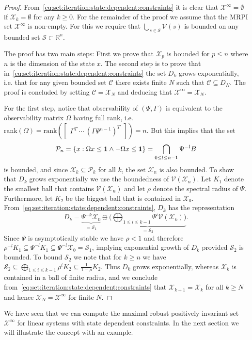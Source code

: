\documentclass[letterpaper, 10pt, conference]{ieeeconf} %
\begin{document}
\begin{proof}
From~\eqref{eq:set:iteration:state:dependent:constraints} it is clear that $\mathcal X^\infty = \emptyset$ 
if $\mathcal X_k =\emptyset$ for any $k\geq 0$. For the remainder of the proof we assume that the MRPI set 
$\mathcal X^\infty$ is non-empty. For this we require that $\bigcup_{s\in\mathcal S}\mathcal V(s)$ is 
bounded on any bounded set $\mathcal S\subset\mathbb R^n$.

The proof has two main steps: First we prove that $\mathcal X_p$ is bounded for $p\leq n$
where $n$ is the dimension of the state $x$. The second step is to prove that in~\eqref{eq:set:iteration:state:dependent:constraints}
the set $D_k$ grows exponentially, i.e. that for any given bounded set $\mathcal C$ there exists
finite $N$ such that $\mathcal C\subseteq D_{N}$. The proof is concluded by setting 
$\mathcal C = \mathcal X_{N}$ and deducing that $\mathcal X^\infty = \mathcal X_N$. 

For the first step, notice that observability of $(\Psi,\Gamma)$ is equivalent to the observability matrix 
$\Omega$ having full rank, i.e.\ $\mathrm{rank}(\Omega) = \mathrm{rank}(\begin{bmatrix} \Gamma^T \ \cdots \ 
(\Gamma\Psi^{n-1})^T\end{bmatrix}) = n$.
But  this implies that the set 
%
\[
\mathcal P_{n} = \{x: 
\Omega x\leq{\bf{1}}\wedge-\Omega x\leq{\bf{1}}\} = \bigcap_{0\leq l\leq n-1} \Psi^{-l} B
\]
%
is bounded, and since $\mathcal X_k\subseteq \mathcal P_k$ for all $k$, 
the set $\mathcal X_{n}$ is also bounded. To show that $D_k$ grows exponentially we use the boundedness 
of $\mathcal V(\mathcal X_{n})$. Let $K_1$ denote the smallest ball that contains $\mathcal V(\mathcal X_{n})$ and let
$\rho$ denote the spectral radius of $\Psi$. Furthermore, let $K_2$
be the biggest ball that is contained in $\mathcal X_{0}$. From~\eqref{eq:set:iteration:state:dependent:constraints}, 
$D_k$ has the representation
%
\begin{equation}
D_k = \underbrace{\Psi^{-k}\mathcal X_0}_{=\mathcal S_1} \ominus \underbrace{\biggl(\bigoplus_{1\leq i\leq k-1} 
\Psi^i\mathcal V(\mathcal X_k)\biggr)}_{=\mathcal S_2}.
\end{equation}
%
Since $\Psi$ is asymptotically stable we have $\rho<1$ and therefore $\rho^{-l}K_1\subseteq\Psi^{-l} K_1 
\subseteq \Psi^{-l}\mathcal X_0 = \mathcal S_1$, implying exponential growth of $D_k$ provided $\mathcal S_2$ 
is bounded. To bound $\mathcal S_2$ we note that for $k\geq n$ we have $\mathcal S_2\subseteq 
\bigoplus_{1\leq i\leq k-1} \rho^i K_2 \subseteq \frac{1}{1-\rho} K_2$. Thus $D_k$ grows exponentially, whereas 
$\mathcal X_k$ is contained in a ball of finite radius, and we conclude from~\eqref{eq:set:iteration:state:dependent:constraints} that 
$\mathcal X_{k+1} = \mathcal X _k$ for all $k\geq N$ and hence $\mathcal X _N = \mathcal X^\infty$ for finite $N$.
\end{proof}
%
We have seen that we can compute the maximal robust positively invariant set $\mathcal X^\infty$ for linear 
systems with state dependent constraints. In the next section we will illustrate the concept with an 
example.
%
%
%
\end{document}
